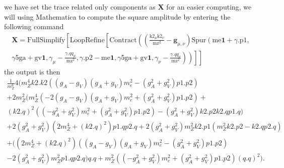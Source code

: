 \documentclass{report}
\numberwithin{equation}{section}
\begin{document}
we have set the trace related only components as \textbf{X} for an easier computing, we will using Mathematica to compute the square amplitude by entering the following command
\begin{equation}
\begin{split}
\textbf{X}=\text{FullSimplify}\left[\text{LoopRefine}\left[\text{Contract}\left(\left(\frac{\text{k2}_{\mu } \text{k2}_{\nu }}{\text{mz}^2}-\mathbf{g}_{\mu ,\nu }\right) \text{Spur}\left(\text{me} \mathbf{1}+\gamma .\text{p1},\right. \right. \right.\right.\\
\left. \left.\left.\left.\text{$\gamma $5}
\text{ga}+\text{gv} \mathbf{1},\gamma _{\mu }-\frac{\gamma .q q_{\mu }}{\text{mz}^2},\gamma .\text{p2}-\text{me} \mathbf{1},\text{$\gamma $5} \text{ga}+\text{gv} \mathbf{1},\gamma _{\nu }-\frac{\gamma .q q_{\nu }}{\text{mz}^2}\right)\right)\right]\right]
\end{split}
\end{equation}
the output is then
\begin{equation}
\begin{split}
\frac{1}{m_Z^6} 4 (m_Z^4 k2.k2 ((g_A - g_V) (g_A + g_V) m_e^2 - (g_A^2 + 
          g_V^2) p1.p2) \\+ 
    2 m_Z^2 (m_Z^4 (-2 (g_A - g_V) (g_A + g_V) m_e^2 + (g_A^2 + 
             g_V^2) p1.p2) +\\ (k2.q)^2 ((-g_A^2 + g_V^2) m_e^2 + (g_A^2 + 
             g_V^2) p1.p2) - (g_A^2 + g_V^2) k2.p2 k2.q p1.q)\\ + 
    2 (g_A^2 + g_V^2) (2 m_Z^4 + (k2.q)^2) p1.q p2.q + 
    2 (g_A^2 + g_V^2) m_Z^2 k2.p1 (m_Z^2 k2.p2 - 
       k2.q p2.q) \\+ ((2 m_Z^4 + (k2.q)^2) ((g_A - g_V) (g_A + 
             g_V) m_e^2 - (g_A^2 + g_V^2) p1.p2) \\- 
       2 (g_A^2 + g_V^2) m_Z^2 p1.q p2.q) q.q + 
    m_Z^2 ((-g_A^2 + g_V^2) m_e^2 + (g_A^2 + g_V^2) p1.p2) (q.q)^2).
\end{split}
\end{equation}
\end{document}
